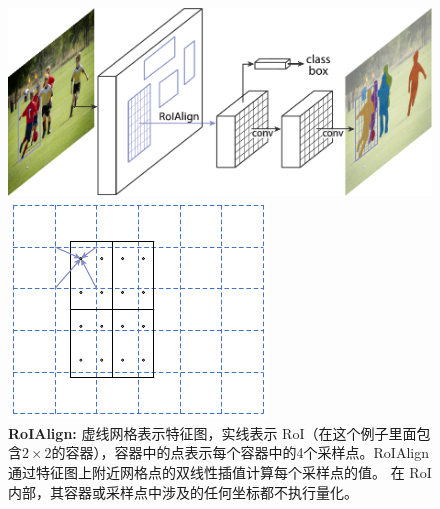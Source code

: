 \begin{figure}
\begin{minipage}{0.35\textwidth}
  \centering
  \includegraphics[width=1\linewidth]{figures/mask_rcnn/teaser}\vspace{2mm}
  \caption{用于实例分割的\textbf{Mask\hspace{0.1297em}R-CNN}框架。}
  \label{fig:teaser}
\end{minipage}\hspace{1.5em}
\begin{minipage}{0.6\textwidth}
  \begin{minipage}{0.365\linewidth}
  \includegraphics[width=\textwidth,trim={0 0 7.5mm 0},clip]{figures/mask_rcnn/roialign}
  \end{minipage}\hspace{0.5em}
  \begin{minipage}{0.605\linewidth}
  \caption{\textbf{RoIAlign:} 虚线网格表示特征图，实线表示 RoI（在这个例子里面包含$2\times2$的容器），容器中的点表示每个容器中的4个采样点。RoIAlign通过特征图上附近网格点的双线性插值计算每个采样点的值。 在 RoI 内部，其容器或采样点中涉及的任何坐标都不执行量化。}
  \label{fig:roialign}
  \end{minipage}
\end{minipage}
\end{figure}

